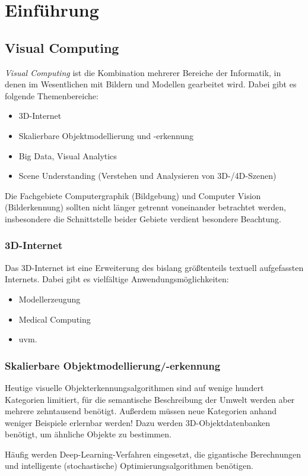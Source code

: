 \chapter{Einführung}
	\section{Visual Computing}
		\emph{Visual Computing} ist die Kombination mehrerer Bereiche der Informatik, in denen im Wesentlichen mit Bildern und Modellen gearbeitet wird. Dabei gibt es \zB folgende Themenbereiche:
		\begin{itemize}
			\item 3D-Internet
			\item Skalierbare Objektmodellierung und -erkennung
			\item Big Data, Visual Analytics
			\item Scene Understanding (Verstehen und Analysieren von 3D-/4D-Szenen)
		\end{itemize}
		Die Fachgebiete Computergraphik (Bildgebung) und Computer Vision (Bilderkennung) sollten nicht länger getrennt voneinander betrachtet werden, insbesondere die Schnittstelle beider Gebiete verdient besondere Beachtung.

		\subsection{3D-Internet}
			Das 3D-Internet ist eine Erweiterung des bislang größtenteils textuell aufgefassten Internets. Dabei gibt es vielfältige Anwendungsmöglichkeiten:
			\begin{itemize}
				\item Modellerzeugung
				\item Medical Computing
				\item uvm.
			\end{itemize}

		\subsection{Skalierbare Objektmodellierung/-erkennung}
			Heutige visuelle Objekterkennungsalgorithmen sind auf wenige hundert Kategorien limitiert, für die semantische Beschreibung der Umwelt werden aber mehrere zehntausend benötigt. Außerdem müssen neue Kategorien anhand weniger Beispiele erlernbar werden! Dazu werden 3D-Objektdatenbanken benötigt, um ähnliche Objekte zu bestimmen.

			Häufig werden Deep-Learning-Verfahren eingesetzt, die gigantische Berechnungen und intelligente (stochastische) Optimierungsalgorithmen benötigen.

